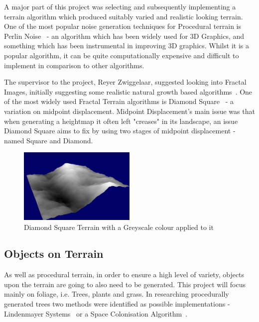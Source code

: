 \documentclass[a4paper,10pt]{report}
\begin{document}
A major part of this project was selecting and subsequently implementing a terrain algorithm which produced suitably varied and realistic looking terrain. One of the most popular noise generation techniques for Procedural terrain is Perlin Noise~\cite{perlin2002improving} - an algorithm which has been widely used for 3D Graphics, and something which has been instrumental in improving 3D graphics. Whilst it is a popular algorithm, it can be quite computationally expensive and difficult to implement in comparison to other algorithms.\medskip

The supervisor to the project, Reyer Zwiggelaar, suggested looking into Fractal Images, initially suggesting some realistic natural growth based algorithms~\cite{Bilsborough3424}. One of the most widely used Fractal Terrain algorithms is Diamond Square~\cite{olsen2004realtime} - a variation on midpoint displacement. Midpoint Displacement's main issue was that when generating a heightmap it often left "creases" in its landscape, an issue Diamond Square aims to fix by using two stages of midpoint displacement - named Square and Diamond.  \medskip

\begin{figure}[h!]
    \centering
  \includegraphics[width=0.5\textwidth]{Images/Screenshots/DiamondSquareGreyScale.png}
 \caption{Diamond Square Terrain with a Greyscale colour applied to it}
 \label{fig:DiamondSquareGrey}
\end{figure}

\subsection{Objects on Terrain}

As well as procedural terrain, in order to ensure a high level of variety, objects upon the terrain are going to also need to be generated. This project will focus mainly on foliage, i.e. Trees, plants and grass. In researching procedurally generated trees two methods were identified as possible implementations - Lindenmayer Systems~\cite{lindenmayer2017} or a Space Colonisation Algorithm~\cite{runions2007modeling}. 
\end{document}
